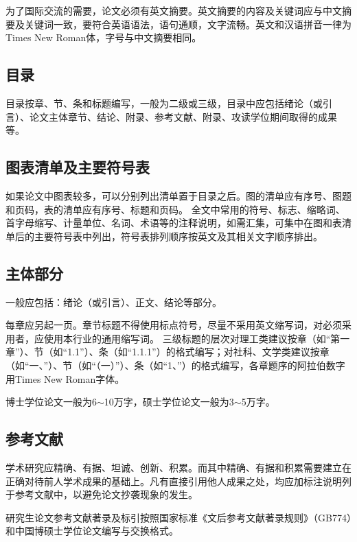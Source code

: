 为了国际交流的需要，论文必须有英文摘要。英文摘要的内容及关键词应与中文摘要及关键词一致，要符合英语语法，语句通顺，文字流畅。英文和汉语拼音一律为Times New Roman体，字号与中文摘要相同。

\subsection{目录}

目录按章、节、条和标题编写，一般为二级或三级，目录中应包括绪论（或引言）、论文主体章节、结论、附录、参考文献、附录、攻读学位期间取得的成果等。

\subsection{图表清单及主要符号表}

如果论文中图表较多，可以分别列出清单置于目录之后。图的清单应有序号、图题和页码，表的清单应有序号、标题和页码。
全文中常用的符号、标志、缩略词、首字母缩写、计量单位、名词、术语等的注释说明，如需汇集，可集中在图和表清单后的主要符号表中列出，符号表排列顺序按英文及其相关文字顺序排出。

\subsection{主体部分}

一般应包括：绪论（或引言）、正文、结论等部分。

每章应另起一页。章节标题不得使用标点符号，尽量不采用英文缩写词，对必须采用者，应使用本行业的通用缩写词。
三级标题的层次对理工类建议按章（如“第一章”）、节（如“1.1”）、条（如“1.1.1”）的格式编写；对社科、文学类建议按章（如“一、”）、节（如“（一）”）、条（如“1、”）的格式编写，各章题序的阿拉伯数字用Times New Roman字体。

博士学位论文一般为6$\sim$10万字，硕士学位论文一般为3$\sim$5万字。

\subsection{参考文献}

学术研究应精确、有据、坦诚、创新、积累。而其中精确、有据和积累需要建立在正确对待前人学术成果的基础上。凡有直接引用他人成果之处，均应加标注说明列于参考文献中，以避免论文抄袭现象的发生。

研究生论文参考文献著录及标引按照国家标准《文后参考文献著录规则》（GB774）和中国博硕士学位论文编写与交换格式。

